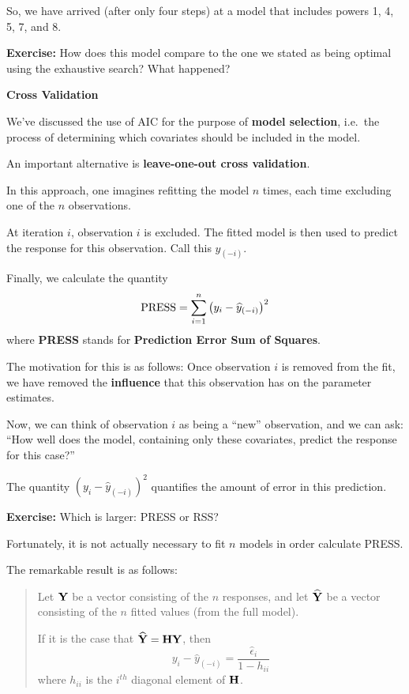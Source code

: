 \documentclass{report}
\begin{document}
So, we have arrived (after only four steps) 
at a model that includes powers 1, 4, 5, 7, and 8.

\textcolor{qcol}{{\bf Exercise:} How does this model compare to the one
we stated as being optimal using the exhaustive search? What happened?}



\newpage
\makerule
{\bf \LARGE Cross Validation}

We've discussed the use of AIC for the purpose of
{\bf model selection}, i.e.~the process of determining which
covariates should be included in the model.

An important alternative is {\bf leave-one-out cross validation}.

In this approach, one imagines refitting the model $n$ times,
each time excluding one of the $n$ observations. 

At iteration $i$, observation $i$ is excluded. The fitted model
is then used to predict the response for this observation. 
Call this $\widehat y_{(-i)}$.

Finally, we calculate the quantity
\[
   {\rm PRESS} = \sum_{i=1}^n \left(y_i -\widehat y_{(-i)}\right)^2
\]
where {\bf PRESS} stands for {\bf Prediction Error Sum of Squares}.

\newpage
The motivation for this is as follows: Once observation $i$ is removed
from the fit, we have removed the {\bf influence} that this observation
has on the parameter estimates.

Now, we can think of observation $i$ as being a ``new'' observation,
and we can ask: ``How well does the model, containing only these covariates,
predict the response for this case?'' 

The quantity $(y_i - \widehat y_{(-i)})^2$ quantifies the amount of error in this
prediction.

\textcolor{qcol}{{\bf Exercise:} Which is larger: PRESS or RSS?}


\newpage
Fortunately, it is not actually necessary to fit $n$ models in order 
calculate PRESS.

The remarkable result is as follows:

\thinrule
\begin{quote}
Let ${\bf Y}$ be a vector consisting of the $n$ responses, and
let $\widehat {\bf Y}$ be a vector consisting of the $n$ fitted
values (from the full model).

If it is the case that $\widehat {\bf Y} = {\bf H} {\bf Y}$, then 
\[
   y_i - \widehat y_{(-i)} = \frac{\widehat \epsilon_i}{1-h_{ii}} 
\]
where $h_{ii}$ is the $i^{th}$ diagonal element of ${\bf H}$.
\end{quote}
\thinrule
\end{document}
